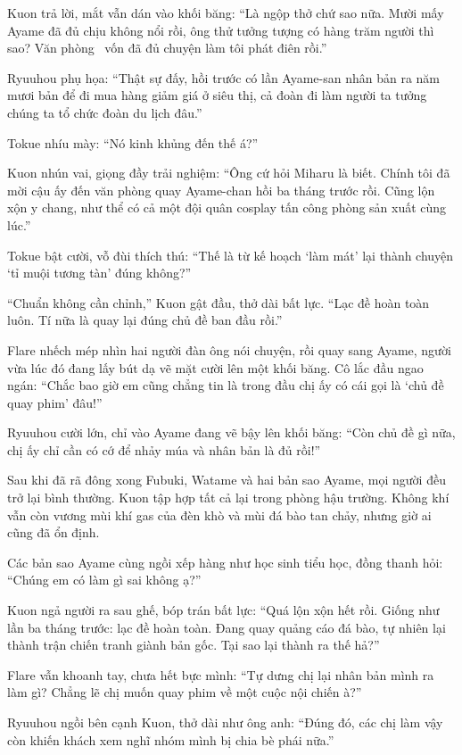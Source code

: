 \documentclass[../main.tex]{subfiles}
\begin{document}
Kuon trả lời, mắt vẫn dán vào khối băng: ``Là ngộp thở chứ sao nữa. Mười mấy Ayame đã đủ chịu không nổi rồi, ông thử tưởng tượng có hàng trăm người thì sao? Văn phòng \hll\ vốn đã đủ chuyện làm tôi phát điên rồi.''

Ryuuhou phụ họa: ``Thật sự đấy, hồi trước có lần Ayame-san nhân bản ra năm mươi bản để đi mua hàng giảm giá ở siêu thị, cả đoàn đi làm người ta tưởng chúng ta tổ chức đoàn du lịch đâu.''

Tokue nhíu mày: ``Nó kinh khủng đến thế á?''

Kuon nhún vai, giọng đầy trải nghiệm: ``Ông cứ hỏi Miharu là biết. Chính tôi đã mời cậu ấy đến văn phòng quay Ayame-chan hồi ba tháng trước rồi. Cũng lộn xộn y chang, như thể có cả một đội quân cosplay tấn công phòng sản xuất cùng lúc.''

Tokue bật cười, vỗ đùi thích thú: ``Thế là từ kế hoạch `làm mát' lại thành chuyện `tỉ muội tương tàn' đúng không?''

``Chuẩn không cần chỉnh,'' Kuon gật đầu, thở dài bất lực. ``Lạc đề hoàn toàn luôn. Tí nữa là quay lại đúng chủ đề ban đầu rồi.''

Flare nhếch mép nhìn hai người đàn ông nói chuyện, rồi quay sang Ayame, người vừa lúc đó đang lấy bút dạ vẽ mặt cười lên một khối băng. Cô lắc đầu ngao ngán: ``Chắc bao giờ em cũng chẳng tin là trong đầu chị ấy có cái gọi là `chủ đề quay phim' đâu!''

Ryuuhou cười lớn, chỉ vào Ayame đang vẽ bậy lên khối băng: ``Còn chủ đề gì nữa, chị ấy chỉ cần có cớ để nhảy múa và nhân bản là đủ rồi!''

\ct

Sau khi đã rã đông xong Fubuki, Watame và hai bản sao Ayame, mọi người đều trở lại bình thường. Kuon tập hợp tất cả lại trong phòng hậu trường. Không khí vẫn còn vương mùi khí gas của đèn khò và mùi đá bào tan chảy, nhưng giờ ai cũng đã ổn định.

Các bản sao Ayame cùng ngồi xếp hàng như học sinh tiểu học, đồng thanh hỏi: ``Chúng em có làm gì sai không ạ?''

Kuon ngả người ra sau ghế, bóp trán bất lực: ``Quá lộn xộn hết rồi. Giống như lần ba tháng trước: lạc đề hoàn toàn. Đang quay quảng cáo đá bào, tự nhiên lại thành trận chiến tranh giành bản gốc. Tại sao lại thành ra thế hả?''

Flare vẫn khoanh tay, chưa hết bực mình: ``Tự dưng chị lại nhân bản mình ra làm gì? Chẳng lẽ chị muốn quay phim về một cuộc nội chiến à?''

Ryuuhou ngồi bên cạnh Kuon, thở dài như ông anh: ``Đúng đó, các chị làm vậy còn khiến khách xem nghĩ nhóm mình bị chia bè phái nữa.''
\end{document}
